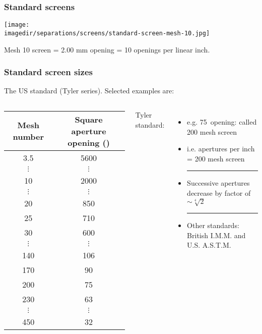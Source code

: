 \begin{frame}\frametitle{Standard screens}
	\begin{center}
		\texttt{[image: \\imagedir/separations/screens/standard-screen-mesh-10.jpg]}
	\end{center}
	Mesh 10 screen = 2.00 mm opening = 10 openings per linear inch.
\end{frame}

\begin{frame}\frametitle{Standard screen sizes}
	The US standard (Tyler series). Selected examples are:	
	\vspace{8pt}
	\begin{columns}[c]
			\begin{tabular}{c|c}
				Mesh number & Square aperture opening (\micron) \\ \hline
				3.5		&	5600	\\
				$\vdots$& 	$\vdots$\\
				10		&	2000	\\
				$\vdots$& 	$\vdots$\\
				20		&	850		\\
				25		& 	710		\\
				30		& 	600		\\
				$\vdots$& 	$\vdots$\\
				140 	& 	106		\\
				170		& 	90		\\
				200		&	75		\\
				230 	&	63		\\ 
				$\vdots$& 	$\vdots$\\
				450 	& 	32
			\end{tabular}
			\small
			Tyler standard:
			\begin{itemize}				
				\item	e.g. 75\micron ~opening: called 200 mesh screen
				\item	i.e. apertures per inch = 200 mesh screen
				\vspace{12pt}
				\hrule
				\vspace{12pt}
				\item	Successive apertures decrease by factor of $\sim \sqrt[4]{2}$
				\vspace{12pt}
				\hrule
				\vspace{12pt}
				\item	Other standards: British I.M.M. and \\ U.S. A.S.T.M.				
			\end{itemize}
	\end{columns}	
\end{frame}

